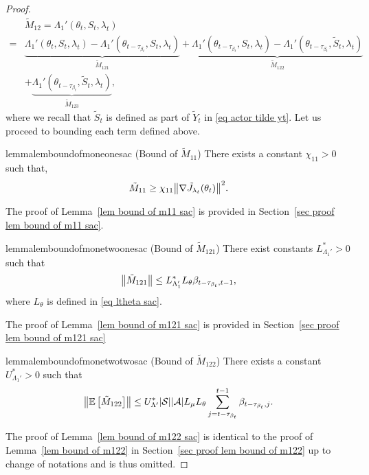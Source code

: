 \documentclass[twoside,11pt]{article}
\newcommand{\fS}{\mathcal{S}}
\newcommand{\fA}{\mathcal{A}}
\newcommand{\E}{\mathbb{E}}
\newcommand{\ns}{{|\fS|}}
\newcommand{\na}{{|\fA|}}
\numberwithin{assucounter}{section}
\begin{document}
\begin{proof}
\begin{align}
    &\tilde M_{12} = \Lambda_1'(\theta_t, S_t, \lambda_t)  \\
    =& \underbrace{\Lambda_1'(\theta_t, S_t, \lambda_t) - \Lambda_1'(\theta_{t-\tau_{\beta_t}}, S_t, \lambda_t)}_{\tilde M_{121}} + \underbrace{\Lambda_1'(\theta_{t-\tau_{\beta_t}}, S_t, \lambda_t) - \Lambda_1'(\theta_{t-\tau_{\beta_t}}, \tilde S_t, \lambda_t)}_{\tilde M_{122}} \\
    &+ \underbrace{\Lambda_1'(\theta_{t-\tau_{\beta_t}}, \tilde S_t, \lambda_t)}_{\tilde M_{123}},
  \end{align}
  where we recall that $\tilde S_t$ is defined as part of $\tilde Y_t$ in \eqref{eq actor tilde yt}.
  Let us proceed to bounding each term defined above.

\begin{restatable}{lemma}{lemboundofmoneonesac}
  \label{lem bound of m11 sac}
(Bound of $\tilde M_{11}$)
There exists a constant $\chi_{11} > 0$ such that,
\begin{align}
  \tilde M_{11} \geq \chi_{11} \norm{\nabla \tilde J_{\lambda_t}(\theta_t)}^2.
\end{align}
\end{restatable}
\noindent
The proof of Lemma~\ref{lem bound of m11 sac} is provided in Section~\ref{sec proof lem bound of m11 sac}.

\begin{restatable}{lemma}{lemboundofmonetwoonesac}
  \label{lem bound of m121 sac}
  (Bound of $\tilde M_{121}$)
  There exist constants $L_{\Lambda_1'}^* > 0$ such that
  \begin{align}
    \norm{\tilde M_{121}} \leq L_{\Lambda_1'}^* L_\theta \beta_{t-\tau_{\beta_t}, t-1},
  \end{align}
  where $L_\theta$ is defined in \eqref{eq ltheta sac}.
\end{restatable}
\noindent
The proof of Lemma~\ref{lem bound of m121 sac} is provided in Section~\ref{sec proof lem bound of m121 sac}

\begin{restatable}{lemma}{lemboundofmonetwotwosac}
  \label{lem bound of m122 sac}
  (Bound of $\tilde M_{122}$)
  There exists a constant $U_{\Lambda_1'}^* > 0$ such that
  \begin{align}
      \norm{\E\left[\tilde M_{122}\right]} \leq U_{\Lambda'}^* \ns \na L_\mu L_\theta \sum_{j=t-\tau_{\beta_t}}^{t-1} \beta_{t-\tau_{\beta_t}, j}.
  \end{align}
\end{restatable}
\noindent
The proof of Lemma~\ref{lem bound of m122 sac} is identical to the proof of Lemma~\ref{lem bound of m122} 
in Section~\ref{sec proof lem bound of m122}
up to change of notations 
and is thus omitted.


\end{proof}
\end{document}
